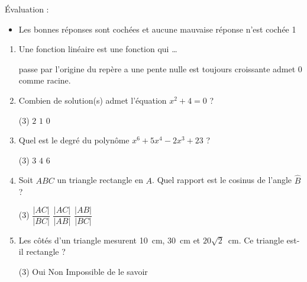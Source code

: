 \documentclass[a4paper, 12pt, parskip=half-]{scrartcl}
\begin{document}
\begin{solution}
    Évaluation :
    \begin{itemize}
        \item Les bonnes réponses sont cochées et aucune mauvaise réponse n'est cochée \hfill 1
    \end{itemize}
    \begin{enumerate}
        \item Une fonction linéaire est une fonction qui \dots
              \begin{QCM}
                  \choice[\faCheckSquare] passe par l'origine du repère
                  \choice a une pente nulle
                  \choice est toujours croissante
                  \choice[\faCheckSquare] admet $0$ comme racine.
              \end{QCM}
        \item Combien de solution(s) admet l'équation $x^2+4=0$ ?
              \begin{QCM}(3)
                  \choice $2$
                  \choice $1$
                  \choice[\faCheckSquare] $0$
              \end{QCM}
        \item Quel est le degré du polynôme $x^6 + 5x^4 -2x^3 +23$ ?
              \begin{QCM}(3)
                  \choice $3$
                  \choice $4$
                  \choice[\faCheckSquare] $6$
              \end{QCM}
        \item Soit $ABC$ un triangle rectangle en $A$. Quel rapport est le cosinus de l'angle $\widehat{B}$ ?
              \begin{QCM}(3)
                  \choice $\dfrac{|AC|}{|BC|}$
                  \choice $\dfrac{|AC|}{|AB|}$
                  \choice[\faCheckSquare] $\dfrac{|AB|}{|BC|}$
              \end{QCM}
        \item Les côtés d'un triangle mesurent \SI{10}{cm}, \SI{30}{cm} et $20\sqrt{2}$~cm. Ce triangle est-il rectangle ?
              \begin{QCM}(3)
                  \choice[\faCheckSquare] Oui
                  \choice Non
                  \choice Impossible de le savoir
              \end{QCM}
    \end{enumerate}
\end{solution}
\vfil
\end{document}
